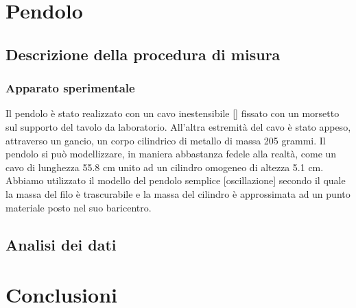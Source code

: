\documentclass[12pt, twoside, a4paper]{article}
\begin{document}
\section{Pendolo}

\subsection{Descrizione della procedura di misura}
\subsubsection{Apparato sperimentale}
Il pendolo è stato realizzato con un cavo inestensibile [] fissato con un morsetto sul supporto del tavolo da laboratorio. All'altra estremità del cavo è stato appeso, attraverso un gancio, un corpo cilindrico di metallo di massa 205 grammi. Il pendolo si può modellizzare, in maniera abbastanza fedele alla realtà, come un cavo di lunghezza 55.8 cm unito ad un cilindro omogeneo di altezza 5.1 cm. Abbiamo utilizzato il modello del pendolo semplice [oscillazione] secondo il quale la massa del filo è trascurabile  e la massa del cilindro è approssimata ad un punto materiale posto nel suo baricentro.
 
\subsection{Analisi dei dati}

\section{Conclusioni}
\end{document}
